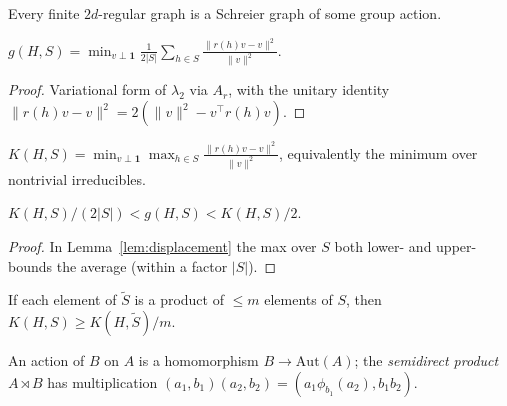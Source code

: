 \begin{theorem}
  \label{thm:gross}
  \notready
  Every finite $2d$-regular graph is a Schreier graph of some group action.
\end{theorem}

\begin{lemma}
  \label{lem:displacement}
  $g(H,S)=\min_{v\perp\mathbf 1}\tfrac1{2|S|}\sum_{h\in S}\tfrac{\|r(h)v-v\|^2}{\|v\|^2}$.
\end{lemma}
\begin{proof}
  Variational form of $\lambda_2$ via $A_r$, with the unitary identity
  $\|r(h)v-v\|^2=2(\|v\|^2-v^\top r(h)v)$.
\end{proof}

\begin{definition}
  \label{def:kazhdan}
  $K(H,S)=\min_{v\perp\mathbf 1}\max_{h\in S}\tfrac{\|r(h)v-v\|^2}{\|v\|^2}$,
  equivalently the minimum over nontrivial irreducibles.
\end{definition}

\begin{proposition}
  \label{prop:kazhdan-gap}
  $K(H,S)/(2|S|)<g(H,S)<K(H,S)/2$.
\end{proposition}
\begin{proof}
  In Lemma~\ref{lem:displacement} the max over $S$ both lower- and upper-bounds
  the average (within a factor $|S|$).
\end{proof}

\begin{claim}
  \label{claim:kazhdan-product}
  \notready
  If each element of $\tilde S$ is a product of $\le m$ elements of $S$, then
  $K(H,S)\ge K(H,\tilde S)/m$.
\end{claim}

\begin{definition}
  \label{def:semidirect}
  An action of $B$ on $A$ is a homomorphism $B\to\mathrm{Aut}(A)$; the
  \emph{semidirect product} $A\rtimes B$ has multiplication
  $(a_1,b_1)(a_2,b_2)=(a_1\phi_{b_1}(a_2),b_1b_2)$.
\end{definition}

